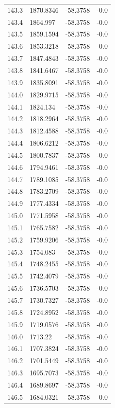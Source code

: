\begin{table}[H]
\begin{tabular}{llll}
143.3 & 1870.8346 & -58.3758 & -0.0 \\
143.4 & 1864.997 & -58.3758 & -0.0 \\
143.5 & 1859.1594 & -58.3758 & -0.0 \\
143.6 & 1853.3218 & -58.3758 & -0.0 \\
143.7 & 1847.4843 & -58.3758 & -0.0 \\
143.8 & 1841.6467 & -58.3758 & -0.0 \\
143.9 & 1835.8091 & -58.3758 & -0.0 \\
144.0 & 1829.9715 & -58.3758 & -0.0 \\
144.1 & 1824.134 & -58.3758 & -0.0 \\
144.2 & 1818.2964 & -58.3758 & -0.0 \\
144.3 & 1812.4588 & -58.3758 & -0.0 \\
144.4 & 1806.6212 & -58.3758 & -0.0 \\
144.5 & 1800.7837 & -58.3758 & -0.0 \\
144.6 & 1794.9461 & -58.3758 & -0.0 \\
144.7 & 1789.1085 & -58.3758 & -0.0 \\
144.8 & 1783.2709 & -58.3758 & -0.0 \\
144.9 & 1777.4334 & -58.3758 & -0.0 \\
145.0 & 1771.5958 & -58.3758 & -0.0 \\
145.1 & 1765.7582 & -58.3758 & -0.0 \\
145.2 & 1759.9206 & -58.3758 & -0.0 \\
145.3 & 1754.083 & -58.3758 & -0.0 \\
145.4 & 1748.2455 & -58.3758 & -0.0 \\
145.5 & 1742.4079 & -58.3758 & -0.0 \\
145.6 & 1736.5703 & -58.3758 & -0.0 \\
145.7 & 1730.7327 & -58.3758 & -0.0 \\
145.8 & 1724.8952 & -58.3758 & -0.0 \\
145.9 & 1719.0576 & -58.3758 & -0.0 \\
146.0 & 1713.22 & -58.3758 & -0.0 \\
146.1 & 1707.3824 & -58.3758 & -0.0 \\
146.2 & 1701.5449 & -58.3758 & -0.0 \\
146.3 & 1695.7073 & -58.3758 & -0.0 \\
146.4 & 1689.8697 & -58.3758 & -0.0 \\
146.5 & 1684.0321 & -58.3758 & -0.0 \\

\end{tabular}
\end{table}
